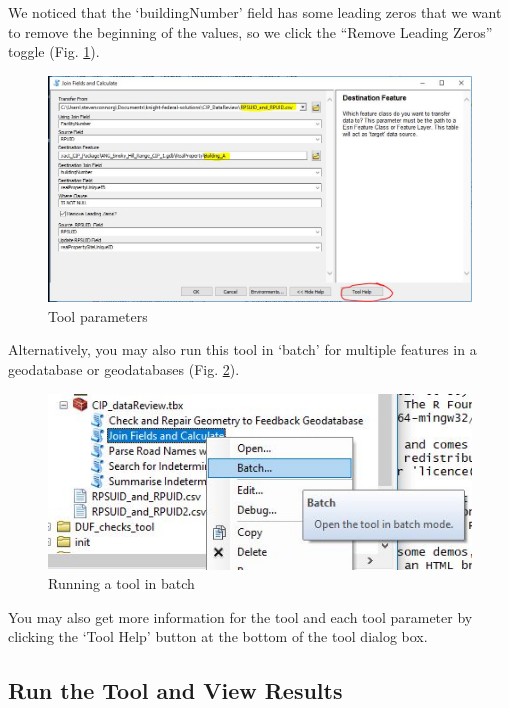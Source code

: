 \documentclass[openany]{book}
\theoremstyle{definition}
\theoremstyle{definition}
\theoremstyle{definition}
\theoremstyle{remark}
\begin{document}
We noticed that the `buildingNumber' field has some leading zeros that
we want to remove the beginning of the values, so we click the ``Remove
Leading Zeros'' toggle (Fig. \ref{fig:jcparams}).

\begin{figure}[H]

{\centering \includegraphics{figures/joinCalc-toolparams} 

}

\caption{Tool parameters}\label{fig:jcparams}
\end{figure}

Alternatively, you may also run this tool in `batch' for multiple
features in a geodatabase or geodatabases (Fig. \ref{fig:batch}).

\begin{figure}[H]

{\centering \includegraphics{figures/joinCalc-batch} 

}

\caption{Running a tool in batch}\label{fig:batch}
\end{figure}

You may also get more information for the tool and each tool parameter
by clicking the `Tool Help' button at the bottom of the tool dialog box.

\subsection{Run the Tool and View
Results}\label{run-the-tool-and-view-results-1}
\end{document}
